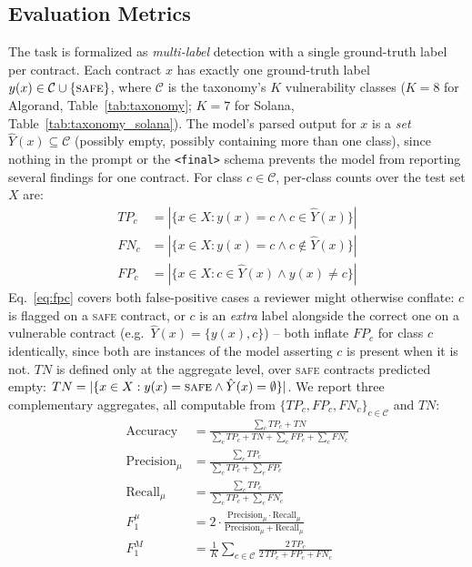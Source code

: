 \documentclass[lettersize,journal]{IEEEtran}
\begin{document}
\subsection{Evaluation Metrics}
\label{sec:metrics}
The task is formalized as \emph{multi-label} detection with a single ground-truth label per
contract. Each contract $x$ has exactly one ground-truth label $y(x) \in \mathcal{C} \cup
\{\textsc{safe}\}$, where $\mathcal{C}$ is the taxonomy's $K$ vulnerability classes ($K=8$ for
Algorand, Table~\ref{tab:taxonomy}; $K=7$ for Solana, Table~\ref{tab:taxonomy_solana}). The model's
parsed output for $x$ is a \emph{set} $\hat{Y}(x) \subseteq \mathcal{C}$ (possibly empty, possibly
containing more than one class), since nothing in the prompt or the \texttt{<final>} schema prevents
the model from reporting several findings for one contract. For class $c \in \mathcal{C}$, per-class
counts over the test set $X$ are:
\begin{align}
TP_c &= |\{x \in X : y(x) = c \wedge c \in \hat{Y}(x)\}| \label{eq:tpc}\\
FN_c &= |\{x \in X : y(x) = c \wedge c \notin \hat{Y}(x)\}| \label{eq:fnc}\\
FP_c &= |\{x \in X : c \in \hat{Y}(x) \wedge y(x) \neq c\}| \label{eq:fpc}
\end{align}
Eq.~\eqref{eq:fpc} covers both false-positive cases a reviewer might otherwise conflate: $c$ is
flagged on a \textsc{safe} contract, or $c$ is an \emph{extra} label alongside the correct one on a
vulnerable contract (e.g.\ $\hat{Y}(x) = \{y(x), c\}$) -- both inflate $FP_c$ for class $c$
identically, since both are instances of the model asserting $c$ is present when it is not. $TN$ is
defined only at the aggregate level, over \textsc{safe} contracts predicted empty: $TN = |\{x \in X
: y(x) = \textsc{safe} \wedge \hat{Y}(x) = \emptyset\}|$. We report three complementary aggregates,
all computable from $\{TP_c, FP_c, FN_c\}_{c \in \mathcal{C}}$ and $TN$:
\begin{align}
\text{Accuracy} &= \frac{\sum_c TP_c + TN}{\sum_c TP_c + TN + \sum_c FP_c + \sum_c FN_c}
\label{eq:accuracy}\\
\text{Precision}_{\mu} &= \frac{\sum_c TP_c}{\sum_c TP_c + \sum_c FP_c} \label{eq:precision}\\
\text{Recall}_{\mu} &= \frac{\sum_c TP_c}{\sum_c TP_c + \sum_c FN_c} \label{eq:recall}\\
F_1^{\mu} &=
2\cdot\frac{\text{Precision}_{\mu}\cdot\text{Recall}_{\mu}}{\text{Precision}_{\mu}+\text{Recall}_{\mu}}
\label{eq:f1}\\
F_1^{M} &= \frac{1}{K}\sum_{c \in \mathcal{C}} \frac{2\, TP_c}{2\,TP_c + FP_c + FN_c}
\label{eq:macrof1}
\end{align}
\end{document}
